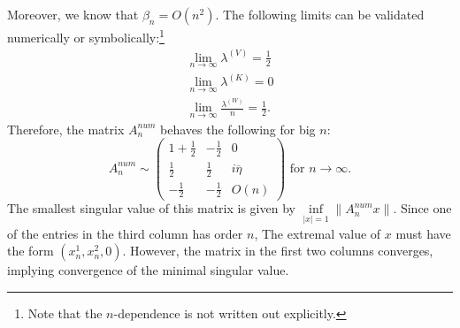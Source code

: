 \documentclass[12pt,journal,compsoc, onecolumn]{IEEEtran}
\begin{document}
Moreover, we know that $\beta_n = O(n^2)$. The following limits can be validated numerically or symbolically:\footnote{Note that the $n$-dependence is not written out explicitly.}
\begin{align}
    \lim\limits_{n \rightarrow \infty} \lambda^{(V)} = \frac{1}{2} \nonumber \\
    \lim\limits_{n \rightarrow \infty} \lambda^{(K)} = 0 \nonumber \\
    \lim\limits_{n \rightarrow \infty} \frac{\lambda^{(W)}}{n} = \frac{1}{2}. \nonumber
\end{align} Therefore, the matrix $A^{num}_n$ behaves the following for big $n$:
$$
    A^{num}_n {\sim} 
    \begin{pmatrix}
        1 + \frac{1}{2} & - \frac{1}{2} & 0 \\
        \frac{1}{2} & \frac{1}{2} & i \overline{\eta} \\
        - \frac{1}{2} & -\frac{1}{2} & O(n)
    \end{pmatrix} \text { for } n \rightarrow \infty.
$$
 The smallest singular value of this matrix is given by $\inf\limits_{|x| = 1} \|A^{num}_n x\| $. Since one of the entries in the third column has order $n$, The extremal value of $x$ must have the form $(x^1_n, x^2_n, 0)$. However, the matrix in the first two columns converges, implying convergence of the minimal singular value.
\end{document}
